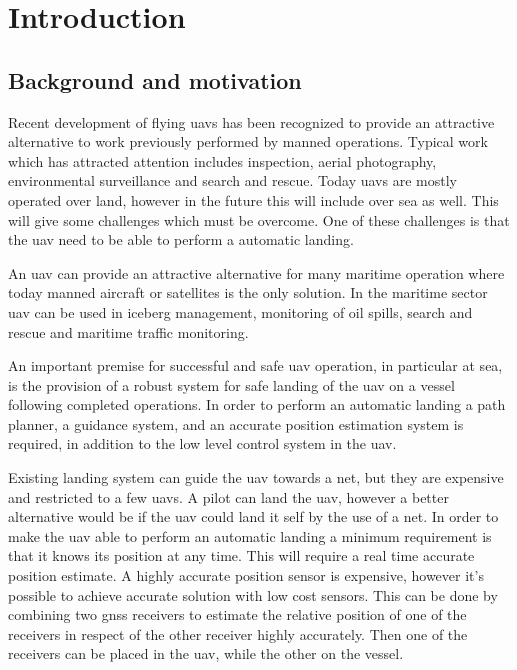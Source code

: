 
\chapter{Introduction}

\section{Background and motivation}
Recent development of flying \glspl{uav} has been recognized to provide an attractive alternative to work previously performed by manned operations. Typical work which has attracted attention includes inspection, aerial photography, environmental surveillance and search and rescue. Today \glspl{uav} are mostly operated over land, however in the future this will include over sea as well. This will give some challenges which must be overcome. One of these challenges is that the \gls{uav} need to be able to perform a automatic landing.

An \gls{uav} can provide an attractive alternative for many maritime operation where today manned aircraft or satellites is the only solution. In the maritime sector \gls{uav} can be used in iceberg management, monitoring of oil spills, search and rescue and maritime traffic monitoring.

An important premise for successful and safe \gls{uav} operation, in particular at sea, is the provision of a robust system for safe landing of the \gls{uav} on a vessel following completed operations. In order to perform an automatic landing a path planner, a guidance system, and an accurate position estimation system is required, in addition to the low level control system in the \gls{uav}.

Existing landing system can guide the \gls{uav} towards a net, but they are expensive and restricted to a few \glspl{uav}. A pilot can land the \gls{uav}, however a better alternative would be if the \gls{uav} could land it self by the use of a net. In order to make the \gls{uav} able to perform an automatic landing a minimum requirement is that it knows its position at any time. This will require a real time accurate position estimate. A highly accurate position sensor is expensive, however it's possible to achieve accurate solution with low cost sensors. This can be done by combining two \gls{gnss} receivers to estimate the relative position of one of the receivers in respect of the other receiver highly accurately. Then one of the receivers can be placed in the \gls{uav}, while the other on the vessel.


